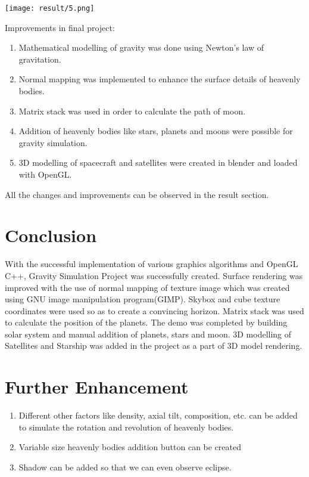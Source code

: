 \documentclass[12pt]{article}
\begin{document}
\begin{center}
\texttt{[image: result/5.png]}
\end{center}

Improvements in final project:
\begin{enumerate}
	\item Mathematical modelling of gravity was done using Newton's law of gravitation.
	\item Normal mapping was implemented to enhance the surface details of heavenly bodies.
	\item Matrix stack was used in order to calculate the path of moon.
	\item Addition of heavenly bodies like stars, planets and moons were possible for gravity simulation.
	\item 3D modelling of spacecraft and satellites were created in blender and loaded with OpenGL.
\end{enumerate}

All the changes and improvements can be observed in the result section.

\clearpage
\section{Conclusion}
With the successful implementation of various graphics algorithms and OpenGL C++, Gravity Simulation Project was successfully created. Surface rendering was improved with the use of normal mapping of texture image which was created using GNU image manipulation program(GIMP). Skybox and cube texture coordinates were used so as to create a convincing horizon. Matrix stack was used to calculate the position of the planets. The demo was completed by building solar system and manual addition of planets, stars and moon. 3D modelling of Satellites and Starship was added in the project as a part of 3D model rendering.

\section{Further Enhancement}
\begin{enumerate}
	\item Different other factors like density, axial tilt, composition, etc.  can be added to simulate the rotation and revolution of heavenly bodies. 
	\item Variable size heavenly bodies addition button can be created
	\item Shadow can be added so that we can even observe eclipse.
\end{enumerate}
\end{document}

